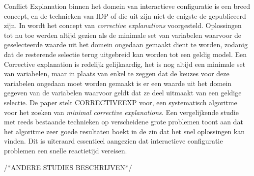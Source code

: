 Conflict Explanation binnen het domein van interactieve configuratie is een breed concept, en de technieken van IDP of die uit \citep{amilhastre2002consistency} zijn niet de enigste de gepubliceerd zijn. In \citep{o2005generating} wordt het concept van \textit{corrective explanations} voorgesteld. Oplossingen tot nu toe werden altijd gezien als de minimale set van variabelen waarvoor de geselecteerde waarde uit het domein ongedaan gemaakt dient te worden, zodanig dat de resterende selectie terug uitgebreid kan worden tot een geldig model. Een Corrective explanation is redelijk gelijkaardig, het is nog altijd een minimale set van variabelen, maar in plaats van enkel te zeggen dat de keuzes voor deze variabelen ongedaan moet worden gemaakt is er een waarde uit het domein gegeven van de variabelen waarvoor geldt dat ze deel uitmaakt van een geldige selectie. De paper stelt CORRECTIVEEXP voor, een systematisch algoritme voor het zoeken van \emph{minimal corrective explanations}. Een vergelijkende studie met reeds bestaande technieken op verscheidene grote problemen toont aan dat het algoritme zeer goede resultaten boekt in de zin dat het snel oplossingen kan vinden. Dit is uiteraard essentieel aangezien dat interactieve configuratie problemen een snelle reactietijd vereisen.

/*ANDERE STUDIES BESCHRIJVEN*/
